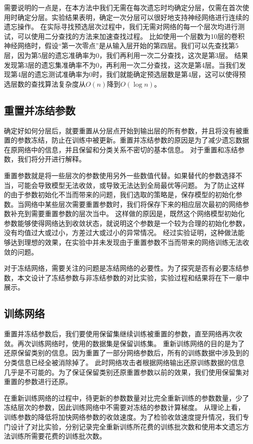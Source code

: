 需要说明的一点是，在本方法中我们无需在每次遗忘时均确定分层，仅需在首次使用时确定分层。实验结果表明，确定一次分层可以很好地支持神经网络进行连续的遗忘操作。
在实际寻找预选层次过程中，我们无需对网络的每一个层次均进行测试，可以使用二分查找的方法来加速查找过程。
比如使用一个层数为10层的卷积神经网络时，假设“第一次零点”是从输入层开始的第四层。我们可以先查找第5层，因为第5层的遗忘准确率为0，我们再利用一次二分查找，这次是第3层。
结果发现第3层的遗忘集准确率不为0，再利用一次二分查找，这次是第4层。当我们发现第4层的遗忘测试准确率为0时，我们就能确定预选层数是第4层，这可以使得预选层数的查找算法复杂度从$O(n)$降到$O(\log n)$。

\subsection{重置并冻结参数}
确定好如何分层后，就要重置从分层点开始到输出层的所有参数，并且将没有被重置的参数冻结，防止在训练中被更新。重置并冻结参数的原因是为了减少遗忘数据在原网络中的信息，并且保留和分类关系不密切的基本信息。
对于重置和冻结参数，我们将分开进行解释。

重置参数就是将一些层次的参数使用另外一些数值代替。如果替代的参数选择不当，可能会导致模型无法收敛，或导致无法达到全局最优等问题。
为了防止这样的由于参数初始化不当而带来的问题，我们选取的策略是，保存模型的初始化参数。当网络中某些层次需要重置参数时，我们将保存下来的相应层次最初的网络参数补充到需要重置参数的层次当中。
这样做的原因是，既然这个网络模型初始化参数能够使得网络达到收敛状态，就说明这个参数是一个较为合理的初始化参数，没有均值过大或过小，方差过大或过小的异常情况。
经过实验证明，这种做法能够达到理想的效果，在实验中并未发现由于重置参数不当而带来的网络训练无法收敛的问题。

对于冻结网络，需要关注的问题是冻结网络的必要性。为了探究是否有必要冻结参数，本文设计了冻结参数与非冻结参数的对比实验，实验过程和结果将在下一章中展示。

\subsection{训练网络}
重置并冻结参数后，我们要使用保留集继续训练被重置的参数，直至网络再次收敛。再次训练网络时，使用的数据集是保留训练集。
重新训练网络的目的是为了还原保留类别的信息。因为重置了一部分网络参数后，所有的训练数据中涉及到的分类信息已经全被消除掉了。
此时网络攻击者根据网络输出还原训练数据的信息几乎是不可能的。为了保证保留类别还原重置参数以前的效果，我们使用保留集对重置的参数进行还原。

在重新训练网络的过程中，待更新的参数数量对比完全重新训练的参数数量，少了冻结层次的参数，因此训练网络中不需要对冻结的参数计算梯度。
从理论上看，训练参数的降低将加快网络参数的收敛速度。为了检验收敛速度提升情况，我们专门设计了对比实验，分别记录完全重新训练所花费的训练批次数和使用本文遗忘方法训练所需要花费的训练批次数。

